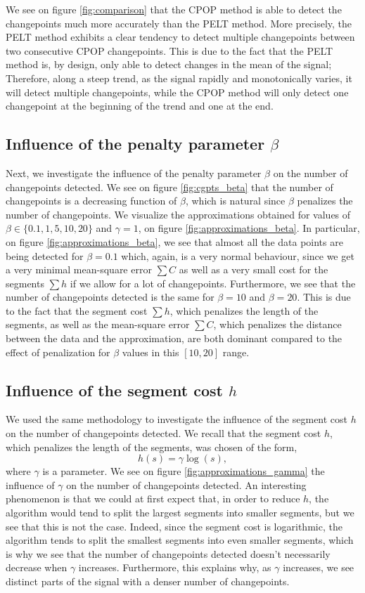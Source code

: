 \documentclass[11pt]{article}
\newcommand{\jump}{\newline\newline}
\begin{document}
We see on figure \ref{fig:comparison} that the CPOP method is able to detect the changepoints much more accurately than the PELT method. More precisely, the PELT method exhibits a clear tendency to detect multiple changepoints between two consecutive CPOP changepoints. This is due to the fact that the PELT method is, by design, only able to detect changes in the mean of the signal; Therefore, along a steep trend, as the signal rapidly and monotonically varies, it will detect multiple changepoints, while the CPOP method will only detect one changepoint at the beginning of the trend and one at the end.

\subsection{Influence of the penalty parameter $\beta$}
Next, we investigate the influence of the penalty parameter $\beta$ on the number of changepoints detected. We see on figure \ref{fig:cgpts_beta} that the number of changepoints is a decreasing function of $\beta$, which is natural since $\beta$ penalizes the number of changepoints. We visualize the approximations obtained for values of $\beta \in \{0.1, 1, 5, 10, 20\}$ and $\gamma = 1$, on figure \ref{fig:approximations_beta}.
\jump
In particular, on figure \ref{fig:approximations_beta}, we see that almost all the data points are being detected for $\beta=0.1$ which, again, is a very normal behaviour, since we get a very minimal mean-square error $\sum C$ as well as a very small cost for the segments $\sum h$ if we allow for a lot of changepoints.
\jump
Furthermore, we see that the number of changepoints detected is the same for $\beta = 10$ and $\beta = 20$. This is due to the fact that the segment cost $\sum h$, which penalizes the length of the segments, as well as the mean-square error $\sum C$, which penalizes the distance between the data and the approximation, are both dominant compared to the effect of penalization for $\beta$ values in this $[10,20]$ range.

\subsection{Influence of the segment cost $h$}
We used the same methodology to investigate the influence of the segment cost $h$ on the number of changepoints detected. We recall that the segment cost $h$, which penalizes the length of the segments, was chosen of the form,
$$ h(s) = \gamma \log(s), $$ where $\gamma$ is a parameter.
\jump
We see on figure \ref{fig:approximations_gamma} the influence of $\gamma$ on the number of changepoints detected. An interesting phenomenon is that we could at first expect that, in order to reduce $h$, the algorithm would tend to split the largest segments into smaller segments, but we see that this is not the case. Indeed, since the segment cost is logarithmic, the algorithm tends to split the smallest segments into even smaller segments, which is why we see that the number of changepoints detected doesn't necessarily decrease when $\gamma$ increases. Furthermore, this explains why, as $\gamma$ increases, we see distinct parts of the signal with a denser number of changepoints.
\end{document}
